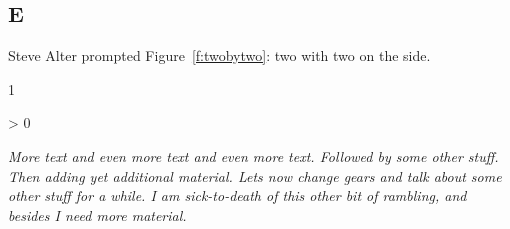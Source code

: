 \documentclass{aiaa}%
\makeatletter
\newcounter{numrepeat}
\newcommand{\replicate}[2]{\par
 \setcounter{numrepeat}{#1}\relax
 \@whilenum \value{numrepeat} > 0 \do
  {{#2}\addtocounter{numrepeat}{-1}}\par}
\newcommand{\filler}%
  {\em More text and even more text and even more text.
   Followed by some other stuff.
   Then adding yet additional material.
   Lets now change gears and talk about some other stuff for a while.
   I am sick-to-death of this other bit of rambling,
   and besides I need more material.}
\makeatother
\begin{document}
\subsection{E}

Steve Alter prompted Figure~\ref{f:twobytwo}: two with two on the side.
\begin{figure*}
%
  \newlength{\firstfigwidth}
  \newlength{\secondfigwidth}
  \newlength{\thirdfigwidth}
%
  \setlength{\firstfigwidth}{0.39745\linewidth}%
  \setlength{\secondfigwidth}{0.39745\linewidth}%
%
  \setlength{\thirdfigwidth}{\linewidth}
  \addtolength{\thirdfigwidth}{-4\tabcolsep}
  \addtolength{\thirdfigwidth}{-\firstfigwidth}
  \addtolength{\thirdfigwidth}{-\secondfigwidth}
%
  \begin{minipage}[t]{\firstfigwidth}
  \end{minipage}%
  \hspace{2\tabcolsep}%
  \begin{minipage}[t]{\secondfigwidth}
  \end{minipage}%
  \hspace{2\tabcolsep}%
  \begin{minipage}[b]{\thirdfigwidth}
    \begin{subfigmatrix}{1}
    \end{subfigmatrix}
  \end{minipage}
%
  \caption{X34 volume grid used for viscous computations.}
  \label{f:twobytwo}
%
\end{figure*}
\replicate{3}{\filler}
\end{document}
